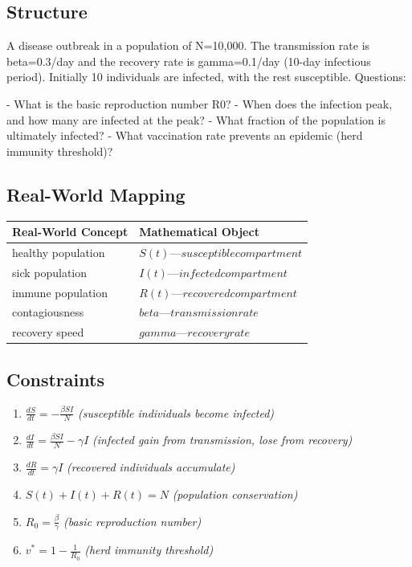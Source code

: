 \documentclass[11pt, a4paper]{article}
\begin{document}
\subsection{Structure}

A disease outbreak in a population of N=10,000. The transmission rate is beta=0.3/day and the recovery rate is gamma=0.1/day (10-day infectious period). Initially 10 individuals are infected, with the rest susceptible. Questions:

- What is the basic reproduction number R0?
- When does the infection peak, and how many are infected at the peak?
- What fraction of the population is ultimately infected?
- What vaccination rate prevents an epidemic (herd immunity threshold)?

\subsection{Real-World Mapping}

\begin{longtable}{ll}
\toprule
\textbf{Real-World Concept} & \textbf{Mathematical Object} \\
\midrule
\endhead
healthy population & $S(t) — susceptible compartment$ \\
sick population & $I(t) — infected compartment$ \\
immune population & $R(t) — recovered compartment$ \\
contagiousness & $beta — transmission rate$ \\
recovery speed & $gamma — recovery rate$ \\
\bottomrule
\end{longtable}

\subsection{Constraints}

\begin{enumerate}
  \item $\frac{dS}{dt} = -\frac{\beta S I}{N}$
  \hfill \textit{(susceptible individuals become infected)}
  \item $\frac{dI}{dt} = \frac{\beta S I}{N} - \gamma I$
  \hfill \textit{(infected gain from transmission, lose from recovery)}
  \item $\frac{dR}{dt} = \gamma I$
  \hfill \textit{(recovered individuals accumulate)}
  \item $S(t) + I(t) + R(t) = N$
  \hfill \textit{(population conservation)}
  \item $R_0 = \frac{\beta}{\gamma}$
  \hfill \textit{(basic reproduction number)}
  \item $v^* = 1 - \frac{1}{R_0}$
  \hfill \textit{(herd immunity threshold)}
\end{enumerate}
\end{document}
